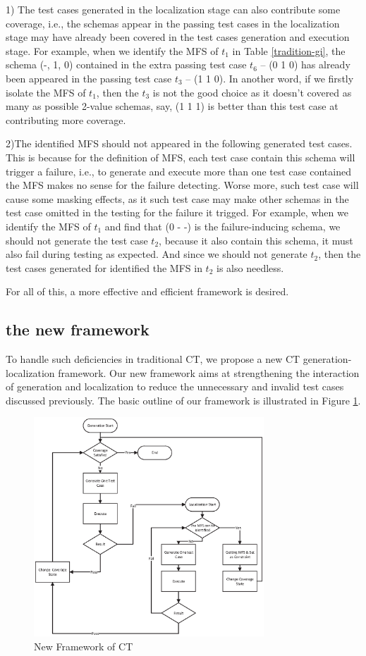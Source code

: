 \documentclass{sig-alternate}
\begin{document}
1) The test cases generated in the localization stage can also contribute some coverage, i.e.,  the schemas appear in the passing test cases in the localization stage may have already been covered in the test cases generation and execution stage.  For example, when we identify the MFS of $t_{1}$ in Table \ref{tradition-gi}, the schema (-, 1, 0) contained in the extra passing test case $t_{6}$ -- (0 1 0) has already been appeared in the passing test case $t_{3}$ -- (1 1 0). In another word, if we firstly isolate the MFS of $t_{1}$, then the $t_{3}$ is not the good choice as it doesn't covered as many as possible 2-value schemas, say, (1 1 1) is better than this test case at contributing more coverage.

2)The identified MFS should not appeared in the following generated test cases.  This is because for the definition of MFS, each test case contain this schema will trigger a failure, i.e., to generate and execute more than one test case contained the MFS makes no sense for the failure detecting. Worse more, such test case will cause some masking effects, as it such test case may make other schemas in the test case omitted in the testing for the failure it trigged.  For example, when we identify the MFS of $t_{1}$ and find that (0 - -) is the failure-inducing schema, we should not generate the test case $t_{2}$, because it also contain this schema, it must also fail during testing as expected. And since we should not generate $t_{2}$, then the test cases generated for identified the MFS in $t_{2}$ is also needless.

For all of this, a more effective and efficient framework is desired.

\subsection{the new framework}
To handle such deficiencies in traditional CT, we propose a new CT generation-localization framework. Our new framework aims at strengthening the interaction of generation and localization to reduce the unnecessary and invalid test cases discussed previously. The basic outline of our framework is illustrated in Figure \ref{new-life}.
\begin{figure}
 \includegraphics[width=3.4in]{baicOutline.eps}
\caption{New Framework of CT}
\label{new-life}
\end{figure}
\end{document}
